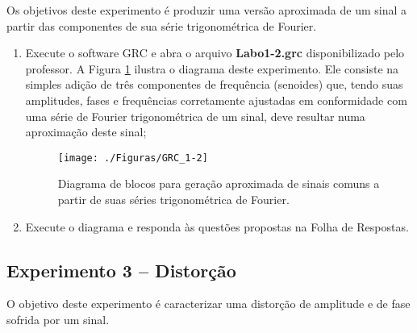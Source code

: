 \documentclass[12pt,addpoints]{exam}
\newcommand{\myscale}{0.4}
\begin{document}
Os objetivos deste experimento é produzir uma versão aproximada de um sinal a partir das componentes de sua série trigonométrica de Fourier.

\begin{enumerate}
    \item Execute o software GRC e abra o arquivo \textbf{Labo1-2.grc} disponibilizado pelo professor. A Figura \ref{fig:GRC_1-2} ilustra o diagrama deste experimento. Ele consiste na simples adição de três componentes de frequência (senoides) que, tendo suas amplitudes, fases e frequências corretamente ajustadas em conformidade com uma série de Fourier trigonométrica de um sinal, deve resultar numa aproximação deste sinal;
    \begin{figure}[htb]
        \centering
        \texttt{[image: ./Figuras/GRC\_1-2]} \\
        \caption{Diagrama de blocos para geração aproximada de sinais comuns a partir de suas séries trigonométrica de Fourier.}
        \label{fig:GRC_1-2}
    \end{figure}
    \item Execute o diagrama e responda às questões propostas na Folha de Respostas.
\end{enumerate}

\subsection{Experimento 3 -- Distorção}

O objetivo deste experimento é caracterizar uma distorção de amplitude e de fase sofrida por um sinal.
\end{document}
